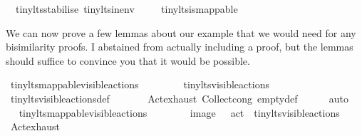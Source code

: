 \begin{isabellebody}
\ \ tiny{\isacharunderscore}{\kern0pt}lts{\isachardot}{\kern0pt}stabilise\ tiny{\isacharunderscore}{\kern0pt}lts{\isachardot}{\kern0pt}in{\isacharunderscore}{\kern0pt}env\ \isanewline
\ \ \isamarkupfalse%
\ tiny{\isacharunderscore}{\kern0pt}lts{\isachardot}{\kern0pt}is{\isacharunderscore}{\kern0pt}mappable\ \isacommand{{\isachardot}{\kern0pt}}\isamarkupfalse%
\isanewline
%
\isanewline
%
\endisatagvisible
{\isafoldvisible}%
%
\isadelimvisible
%
\endisadelimvisible
%
\begin{isamarkuptext}%
We can now prove a few lemmas about our example \LTSt{} that we would need for any bisimilarity proofs. I abstained from actually including a proof, but the lemmas should suffice to convince you that it would be possible.%
\end{isamarkuptext}\isamarkuptrue%
%
\isadelimvisible
%
\endisadelimvisible
%
\isatagvisible
{}\isamarkupfalse%
\ {\isacartoucheopen}tiny{\isacharunderscore}{\kern0pt}lts{\isacharunderscore}{\kern0pt}mappable{\isachardot}{\kern0pt}visible{\isacharunderscore}{\kern0pt}actions\ {\isacharequal}{\kern0pt}\ {\isasymemptyset}{\isacartoucheclose}\ \isanewline
{}\isamarkupfalse%
\ {\isacharminus}{\kern0pt}\isanewline
\ \ \isamarkupfalse%
\ {\isacartoucheopen}tiny{\isacharunderscore}{\kern0pt}lts{\isachardot}{\kern0pt}visible{\isacharunderscore}{\kern0pt}actions\ {\isacharequal}{\kern0pt}\ {\isasymemptyset}{\isacartoucheclose}\isanewline
\ \ \ \ \isamarkupfalse%
\ tiny{\isacharunderscore}{\kern0pt}lts{\isachardot}{\kern0pt}visible{\isacharunderscore}{\kern0pt}actions{\isacharunderscore}{\kern0pt}def\ \isanewline
\ \ \ \ \ \ Act{\isachardot}{\kern0pt}exhaust\ Collect{\isacharunderscore}{\kern0pt}cong\ empty{\isacharunderscore}{\kern0pt}def\isanewline
\ \ \ \ \isamarkupfalse%
\ auto\isanewline
\ \ \isamarkupfalse%
\ \isamarkupfalse%
\ {\isacartoucheopen}tiny{\isacharunderscore}{\kern0pt}lts{\isacharunderscore}{\kern0pt}mappable{\isachardot}{\kern0pt}visible{\isacharunderscore}{\kern0pt}actions\ \isanewline
\ \ \ \ \ \ {\isacharequal}{\kern0pt}\ image\ {\isacharparenleft}{\kern0pt}{\isasymlambda}\ {\isasymalpha}{\isachardot}{\kern0pt}\ act\ {\isasymalpha}{\isacharparenright}{\kern0pt}\ tiny{\isacharunderscore}{\kern0pt}lts{\isachardot}{\kern0pt}visible{\isacharunderscore}{\kern0pt}actions{\isacartoucheclose}\isanewline
\ \ \ \ \isamarkupfalse%
\ Act{\isachardot}{\kern0pt}exhaust\ \isanewline

\end{isabellebody}
